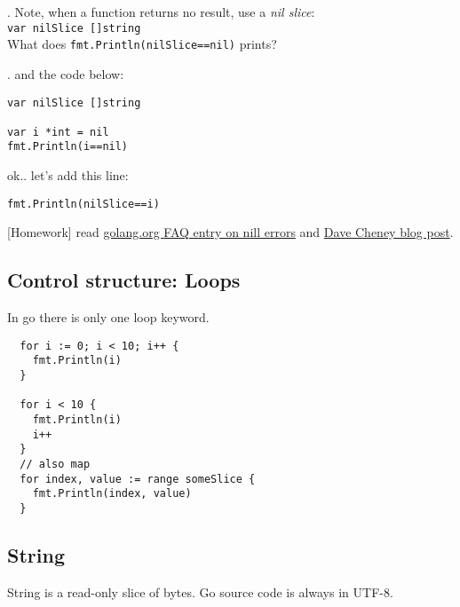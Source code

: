 \documentclass[11pt, letterpaper]{article}
\begin{document}
. Note, when a function returns no result, use a \emph{nil slice}:\\ \texttt{var nilSlice []string} \\ What does \texttt{fmt.Println(nilSlice==nil)} prints?

. and the code below:
\begin{verbatim}
var nilSlice []string

var i *int = nil
fmt.Println(i==nil)
\end{verbatim}

ok.. let's add this line:

\begin{verbatim}
fmt.Println(nilSlice==i)
\end{verbatim}

[Homework] read \href{https://golang.org/doc/faq#nil_error}{golang.org {\small FAQ} entry on nill errors} and \href{https://dave.cheney.net/2017/08/09/typed-nils-in-go-2}{Dave Cheney blog post}.







\subsection{Control structure: Loops}

In go there is only one loop keyword.

\begin{verbatim}
  for i := 0; i < 10; i++ {
    fmt.Println(i)
  }

  for i < 10 {
    fmt.Println(i)
    i++
  }
  // also map
  for index, value := range someSlice {
    fmt.Println(index, value)
  }
\end{verbatim}

\subsection{String}

String is a read-only slice of bytes. Go source code is always in UTF-8.
\end{document}
